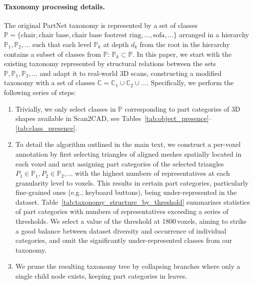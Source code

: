 \paragraph{Taxonomy processing details. }
\label{dataset:taxonomy-detail}
The original PartNet taxonomy is represented by a set of classes $\mathbb{P} = \{\text{chair}, \text{chair base}, \text{chair base footrest ring}, \ldots, \text{sofa}, \ldots\}$ arranged in a hierarchy $\mathbb{P}_1, \mathbb{P}_2, \ldots$ such that each level $\mathbb{P}_k$ at depth $d_k$ from the root in the hierarchy contains a subset of classes from $\mathbb{P}$: $\mathbb{P}_k \subset \mathbb{P}$. 
In this paper, we start with the existing taxonomy represented by structural relations between the sets $\mathbb{P}, \mathbb{P}_1, \mathbb{P}_2, \ldots$ and adapt it to real-world 3D scans, constructing a modified taxonomy with a set of classes $\mathbb{C} = \mathbb{C}_1 \cup \mathbb{C}_2 \cup \ldots$. 
Specifically, we perform the following series of steps: 
\begin{enumerate}
    \item Trivially, we only select classes in $\mathbb{P}$ corresponding to part categories of 3D shapes available in Scan2CAD, see Tables~\ref{tab:object_presence}--\ref{tab:class_presence}.

    \item To detail the algorithm outlined in the main text, we construct a per-voxel annotation by first selecting triangles of aligned meshes spatially located in each voxel and next assigning part categories of the selected triangles $P_1 \in \mathbb{P}_1, P_2 \in \mathbb{P}_2, \ldots$ with the highest numbers of representatives at each granularity level to voxels. 
    This results in certain part categories, particularly fine-grained ones (e.g., keyboard buttons), being under-represented in the dataset.
    Table~\ref{tab:taxonomy_structure_by_threshold} summarizes statistics of part categories with numbers of representatives exceeding a series of thresholds.
    We select a value of the threshold at 1800\,voxels, aiming to strike a good balance between dataset diversity and occurrence of individual categories, and omit the significantly under-represented classes from our taxonomy.

    \item We prune the resulting taxonomy tree by collapsing branches where only a single child node exists, keeping part categories in leaves. 

\end{enumerate}

